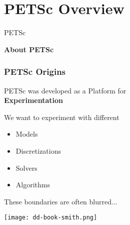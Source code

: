 

\section{PETSc Overview}
\begin{frame}{PETSc}
   \begin{center} \Large \textbf{About PETSc} \end{center}
\end{frame}

\begin{frame}[fragile]
\frametitle{PETSc Origins}
 
 \begin{center} \LARGE
  PETSc was developed as a Platform for \\[0.2em] \textbf{\color{ddviolet} Experimentation}
 \end{center}

 \vspace{1cm}
 \begin{block}{We want to experiment with different}
 \begin{itemize}
  \item Models
  \item Discretizations
  \item Solvers
  \item Algorithms
 \end{itemize}
 \end{block}

 \begin{block}{These boundaries are often blurred...}
 \end{block}

 \begin{flushright}
  \vspace*{-5cm}
  \texttt{[image: dd-book-smith.png]}
 \end{flushright}

\end{frame}

